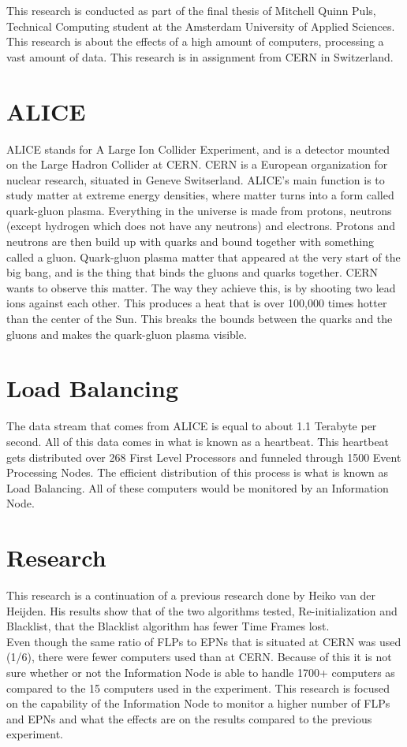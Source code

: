 This research is conducted as part of the final thesis of Mitchell Quinn Puls, Technical Computing student at the Amsterdam University of Applied Sciences. This research is about the effects of a high amount of computers, processing a vast amount of data. This research is in assignment from CERN in Switzerland. 
\section{ALICE}
ALICE stands for A Large Ion Collider Experiment, and is a detector mounted on the Large Hadron Collider at CERN. CERN is a European organization for  nuclear research, situated in Geneve Switserland. ALICE's main function is to study matter at extreme energy densities, where matter turns into a form called quark-gluon plasma. Everything in the universe is made from protons, neutrons (except hydrogen which does not have any neutrons) and electrons. Protons and neutrons are then build up with quarks and bound together with something called a gluon. Quark-gluon plasma matter that appeared at the very start of the big bang, and is the thing that binds the gluons and quarks together. CERN wants to observe this matter. The way they achieve this, is by shooting two lead ions against each other. This produces a heat that is over 100,000 times hotter than the center of the Sun. This breaks the bounds between the quarks and the gluons and makes the quark-gluon plasma visible.

\section{Load Balancing}
The data stream that comes from ALICE is equal to about 1.1 Terabyte per second. All of this data comes in what is known as a heartbeat. This heartbeat gets distributed over 268 First Level Processors and funneled through	1500 Event Processing Nodes. The efficient distribution of this process is what is known as Load Balancing. All of these computers would be monitored by an Information Node.

\section{Research}
This research is a continuation of a previous research done by Heiko van der Heijden. His results show that of the two algorithms tested, Re-initialization and Blacklist, that the Blacklist algorithm has fewer Time Frames lost.\\
Even though the same ratio of FLPs to EPNs that is situated at CERN was used (1/6), there were fewer computers used than at CERN. Because of this it is not sure whether or not the Information Node is able to handle 1700+ computers as compared to the 15 computers used in the experiment. This research is focused on the capability of the Information Node to monitor a higher number of FLPs and EPNs and what the effects are on the results compared to the previous experiment.

